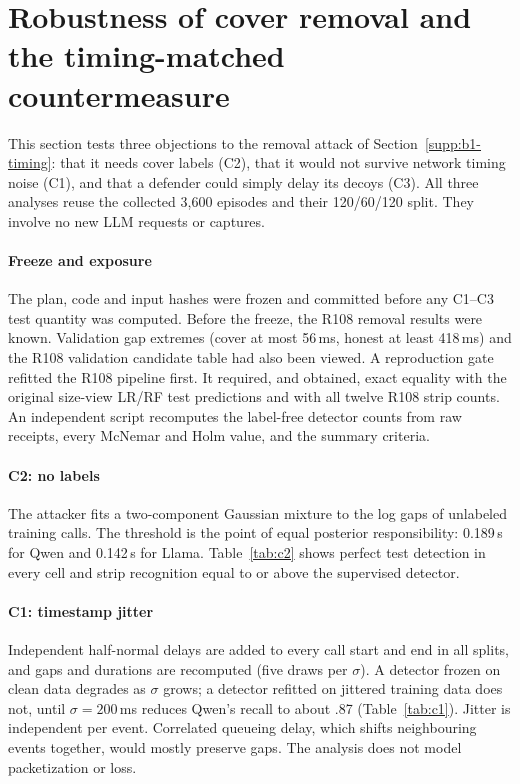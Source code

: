 \section{Robustness of cover removal and the timing-matched countermeasure}\label{supp:c-ext}
This section tests three objections to the removal attack of Section~\ref{supp:b1-timing}: that it needs cover labels (C2), that it would not survive network timing noise (C1), and that a defender could simply delay its decoys (C3). All three analyses reuse the collected 3,600 episodes and their 120/60/120 split. They involve no new LLM requests or captures.

\paragraph{Freeze and exposure}
The plan, code and input hashes were frozen and committed before any C1--C3 test quantity was computed. Before the freeze, the R108 removal results were known. Validation gap extremes (cover at most 56\,ms, honest at least 418\,ms) and the R108 validation candidate table had also been viewed. A reproduction gate refitted the R108 pipeline first. It required, and obtained, exact equality with the original size-view LR/RF test predictions and with all twelve R108 strip counts. An independent script recomputes the label-free detector counts from raw receipts, every McNemar and Holm value, and the summary criteria.

\paragraph{C2: no labels}
The attacker fits a two-component Gaussian mixture to the log gaps of unlabeled training calls. The threshold is the point of equal posterior responsibility: 0.189\,s for Qwen and 0.142\,s for Llama. Table~\ref{tab:c2} shows perfect test detection in every cell and strip recognition equal to or above the supervised detector.

\paragraph{C1: timestamp jitter}
Independent half-normal delays are added to every call start and end in all splits, and gaps and durations are recomputed (five draws per $\sigma$). A detector frozen on clean data degrades as $\sigma$ grows; a detector refitted on jittered training data does not, until $\sigma=200$\,ms reduces Qwen's recall to about .87 (Table~\ref{tab:c1}). Jitter is independent per event. Correlated queueing delay, which shifts neighbouring events together, would mostly preserve gaps. The analysis does not model packetization or loss.

